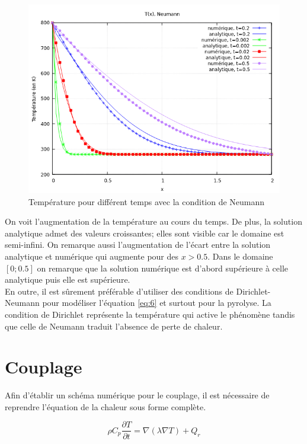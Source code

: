 \documentclass[a4paper,11pt]{article}
\begin{document}
\begin{figure}[H]
    \centering
    \includegraphics[width=0.8\linewidth]{images/graphe_temperature_Neumann_titre_grid.png}
    \caption{Température pour différent temps avec la condition de Neumann}
    \label{fig:enter-label}
\end{figure}

On voit l'augmentation de la température au cours du temps. De plus, la solution analytique admet des valeurs croissantes; elles sont visible car le domaine est semi-infini. On remarque aussi l'augmentation de l'écart entre la solution analytique et numérique qui augmente pour des $x>0.5$. Dans le domaine $[0;0.5]$ on remarque que la solution numérique est d'abord supérieure à celle analytique puis elle est supérieure.\\

En outre, il est sûrement préférable d'utiliser des conditions de Dirichlet-Neumann pour modéliser l'équation \eqref{eq:6} et surtout pour la pyrolyse. La condition de Dirichlet représente la température qui active le phénomène tandis que celle de Neumann traduit l'absence de perte de chaleur.

\section{Couplage}

Afin d'établir un schéma numérique pour le couplage, il est nécessaire de reprendre l'équation de la chaleur sous forme complète.


\begin{equation}\label{eq:chaleur}
\rho C_p\frac{\partial T}{\partial t} =    \nabla(\lambda\nabla T) + Q_r
\end{equation}
\end{document}
